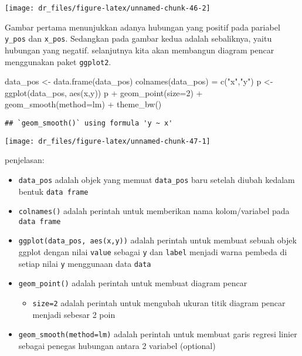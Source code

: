 \documentclass[
]{book}
\newenvironment{Shaded}{\begin{snugshade}}{\end{snugshade}}
\newcommand{\AttributeTok}[1]{\textcolor[rgb]{0.77,0.63,0.00}{#1}}
\newcommand{\DecValTok}[1]{\textcolor[rgb]{0.00,0.00,0.81}{#1}}
\newcommand{\FunctionTok}[1]{\textcolor[rgb]{0.00,0.00,0.00}{#1}}
\newcommand{\NormalTok}[1]{#1}
\newcommand{\OtherTok}[1]{\textcolor[rgb]{0.56,0.35,0.01}{#1}}
\newcommand{\SpecialCharTok}[1]{\textcolor[rgb]{0.00,0.00,0.00}{#1}}
\newcommand{\StringTok}[1]{\textcolor[rgb]{0.31,0.60,0.02}{#1}}
\providecommand{\tightlist}{%
  \setlength{\itemsep}{0pt}\setlength{\parskip}{0pt}}
\begin{document}
\begin{center}\texttt{[image: dr\_files/figure-latex/unnamed-chunk-46-2]} \end{center}

Gambar pertama menunjukkan adanya hubungan yang positif pada pariabel \texttt{y\_pos} dan \texttt{x\_pos}. Sedangkan pada gambar kedua adalah sebaliknya, yaitu hubungan yang negatif. selanjutnya kita akan membangun diagram pencar menggunakan paket \texttt{ggplot2}.

\begin{Shaded}
\begin{Highlighting}[]
\NormalTok{data\_pos }\OtherTok{\textless{}{-}} \FunctionTok{data.frame}\NormalTok{(data\_pos)}
\FunctionTok{colnames}\NormalTok{(data\_pos) }\OtherTok{=} \FunctionTok{c}\NormalTok{(}\StringTok{"x"}\NormalTok{,}\StringTok{"y"}\NormalTok{)}
\NormalTok{p }\OtherTok{\textless{}{-}} \FunctionTok{ggplot}\NormalTok{(data\_pos, }\FunctionTok{aes}\NormalTok{(x,y))}
\NormalTok{p }\SpecialCharTok{+} \FunctionTok{geom\_point}\NormalTok{(}\AttributeTok{size=}\DecValTok{2}\NormalTok{) }\SpecialCharTok{+} 
  \FunctionTok{geom\_smooth}\NormalTok{(}\AttributeTok{method=}\NormalTok{lm) }\SpecialCharTok{+}
  \FunctionTok{theme\_bw}\NormalTok{()}
\end{Highlighting}
\end{Shaded}

\begin{verbatim}
## `geom_smooth()` using formula 'y ~ x'
\end{verbatim}

\begin{center}\texttt{[image: dr\_files/figure-latex/unnamed-chunk-47-1]} \end{center}

penjelasan:

\begin{itemize}
\tightlist
\item
  \texttt{data\_pos} adalah objek yang memuat \texttt{data\_pos} baru setelah diubah kedalam bentuk \texttt{data\ frame}
\item
  \texttt{colnames()} adalah perintah untuk memberikan nama kolom/variabel pada \texttt{data\ frame}
\item
  \texttt{ggplot(data\_pos,\ aes(x,y))} adalah perintah untuk membuat sebuah objek ggplot dengan nilai \texttt{value} sebagai \texttt{y} dan \texttt{label} menjadi warna pembeda di setiap nilai \texttt{y} menggunaan data \texttt{data}
\item
  \texttt{geom\_point()} adalah perintah untuk membuat diagram pencar

  \begin{itemize}
  \tightlist
  \item
    \texttt{size=2} adalah perintah untuk mengubah ukuran titik diagram pencar menjadi sebesar 2 poin
  \end{itemize}
\item
  \texttt{geom\_smooth(method=lm)} adalah perintah untuk membuat garis regresi linier sebagai penegas hubungan antara 2 variabel (optional)
\end{itemize}
\end{document}
